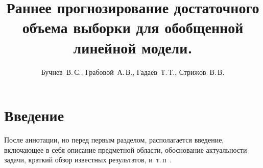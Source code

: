 \documentclass[12pt,twoside]{article}
\title
    [Раннее прогнозирование достаточного объема выборки для обобщенной линейной модели.] %
    {Раннее прогнозирование достаточного объема выборки для обобщенной линейной модели.}
\author
    {Бучнев~В.\,С., Грабовой~А.\,В., Гадаев~Т.\,Т., Стрижов~В.\,В.} %
\begin{document}
\maketitle

\section{Введение}
После аннотации, но перед первым разделом,
располагается введение, включающее в себя
описание предметной области,
обоснование актуальности задачи,
краткий обзор известных результатов,
и~т.\,п~\cite{author09anyscience,myHandbook,author09first-word-of-the-title,voron06latex,author-and-co2007,Lvovsky03}.
\end{document}
